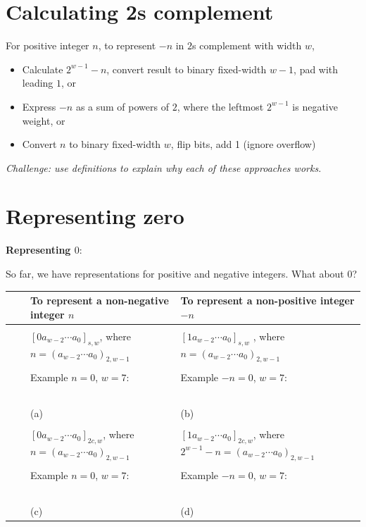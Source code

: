 \documentclass[12pt, oneside]{article}
\begin{document}
\section*{Calculating 2s complement}


For positive integer $n$, to represent $-n$ in 
$2$s complement with width $w$,
\begin{itemize}
    \item Calculate $2^{w-1} - n$, convert 
    result to binary fixed-width $w-1$, pad 
    with leading $1$, or
    \item Express $-n$ as a sum of powers of $2$, 
    where the leftmost $2^{w-1}$ is negative weight, or
    \item Convert $n$ to binary fixed-width $w$, 
    flip bits, add 1 (ignore overflow)
\end{itemize}

{\it Challenge: use definitions to explain why
each of these approaches works.} \vfill
\section*{Representing zero}


{\bf Representing $0$}:

So far, we have representations for
positive and negative integers. What about $0$?

\begin{tabular}{|cc|p{3.4in}|p{3.7in}|}
   \hline
   & & To  represent a {\bf non-negative} integer $n$ & To represent a {\bf non-positive} integer $-n$\\
   \hline
   && &  \\
   &\parbox[t]{2mm}{} &
   $[ 0a_{w-2} \cdots a_0]_{s,w}$, where $n =  (a_{w-2} \cdots a_0)_{2,w-1}$& 
   $[1a_{w-2} \cdots a_0]_{s,w}$
   , where $n =  (a_{w-2} \cdots a_0)_{2,w-1}$\\
   && & \\
   && Example $n=0$, $w=7$:  & Example $-n=0$, $w=7$: \\
   && & \\
   && & \\
   && & \\
   && & \\
   && & \\
   && (a) & (b)\\
   \hline
   &&  &  \\
   &\parbox[t]{2mm}{} &
   $[0a_{w-2} \cdots a_0]_{2c,w}$, where $n =  (a_{w-2} \cdots a_0)_{2,w-1}$& $[1a_{w-2} \cdots a_0]_{2c,w}$, where $2^{w-1} - n =  (a_{w-2} \cdots a_0)_{2,w-1}$\\
   && & \\
   && Example $n=0$, $w=7$:  & Example $-n=0$, $w=7$: \\
   && & \\
   && & \\
   && & \\
   && & \\
   && & \\
   && (c) & (d) \\
   \hline
\end{tabular} \vfill
\end{document}
